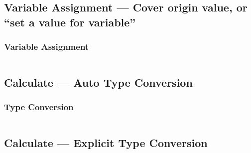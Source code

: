 \documentclass[
  11pt, %
  xcolor=dvipsnames
]{beamer}
\begin{document}
\subsection{Variable Assignment --- Cover origin value, or ``set a value for variable''}
\begin{frame}[fragile]
	\frametitle{Variable Assignment}


	\begin{columns}[c]
		\begin{column}{0.9\textwidth}


		\end{column}
	\end{columns}

\end{frame}

\subsection{Calculate --- Auto Type Conversion}
\begin{frame}[fragile]
	\frametitle{Type Conversion}


	\begin{columns}[c]
		\begin{column}{0.9\textwidth}


		\end{column}
	\end{columns}

\end{frame}

\subsection{Calculate --- Explicit Type Conversion}
\begin{frame}[fragile]

	\begin{columns}[c]
		\begin{column}{0.9\textwidth}


		\end{column}
	\end{columns}

\end{frame}
\end{document}
